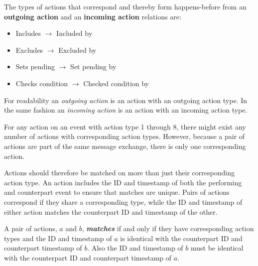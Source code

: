 	\begin{definition}
		\label{def:happensbeforeaction}
		The types of actions that correspond and thereby form happens-before from an \textbf{outgoing action} and an \textbf{incoming action} relations are:
			\begin{itemize}
				\item Includes $\rightarrow$ Included by
				\item Excludes $\rightarrow$ Excluded by
				\item Sets pending $\rightarrow$ Set pending by
				\item Checks condition $\rightarrow$ Checked condition by
			\end{itemize}
	\end{definition}
	
	\newpar For readability an \textit{outgoing action} is an action with an outgoing action type. In the same fashion an \textit{incoming action} is an action with an incoming action type.
	
	\newpar For any action on an event with action type 1 through 8, there might exist any number of actions with corresponding action types. However, because a pair of actions are part of the same message exchange, there is only one corresponding action.
	
	Actions should therefore be matched on more than just their corresponding action type. An action includes the ID and timestamp of both the performing and counterpart event to ensure that matches are unique.
    Pairs of actions correspond if they share a corresponding type, while the ID and timestamp of either action matches the counterpart ID and timestamp of the other.
    
    \begin{definition}
    	\label{def:action:matching}
    	A pair of actions, $a$ and $b$, \textit{\textbf{matches}} if and only if they have corresponding action types and the ID and timestamp of $a$ is identical with the counterpart ID and counterpart timestamp of $b$. Also the ID and timestamp of $b$ must be identical with the counterpart ID and counterpart timestamp of $a$.
    \end{definition}
    
